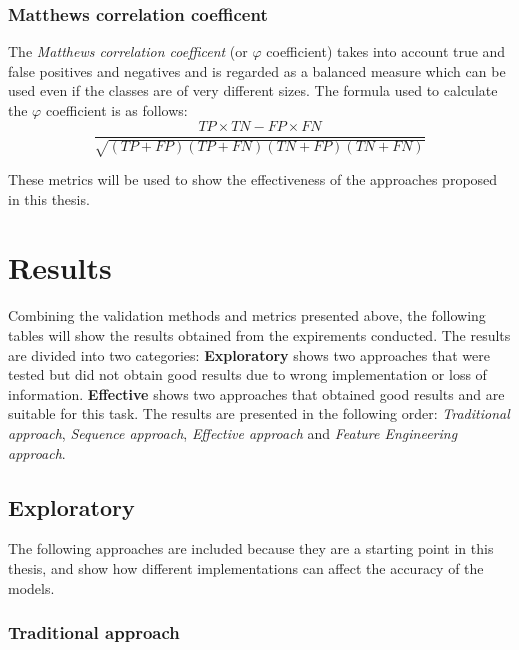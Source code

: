             \subsubsection{Matthews correlation coefficent} 

                The \textit{Matthews correlation coefficent} (or $\varphi$ coefficient) takes into account true and false positives and negatives and is regarded as a balanced measure which can be used even if the classes are of very different sizes. The formula used to calculate the $\varphi$ coefficient is as follows: 
                \begin{equation}
                    \frac{TP \times TN - FP \times FN}{\sqrt{(TP + FP)(TP + FN)(TN + FP)(TN + FN)}}
                \end{equation}

            These metrics will be used to show the effectiveness of the approaches proposed in this thesis.
    
\section{Results}
        
        Combining the validation methods and metrics presented above, the following tables will show the results obtained from the expirements conducted. The results are divided into two categories: \textbf{Exploratory} shows two approaches that were tested but did not obtain good results due to wrong implementation or loss of information. \textbf{Effective} shows two approaches that obtained good results and are suitable for this task. The results are presented in the following order: \textit{Traditional approach}, \textit{Sequence approach}, \textit{Effective approach} and \textit{Feature Engineering approach}. 

        \subsection{Exploratory}

            The following approaches are included because they are a starting point in this thesis, and show how different implementations can affect the accuracy of the models.
            
            \subsubsection{Traditional approach}
                
